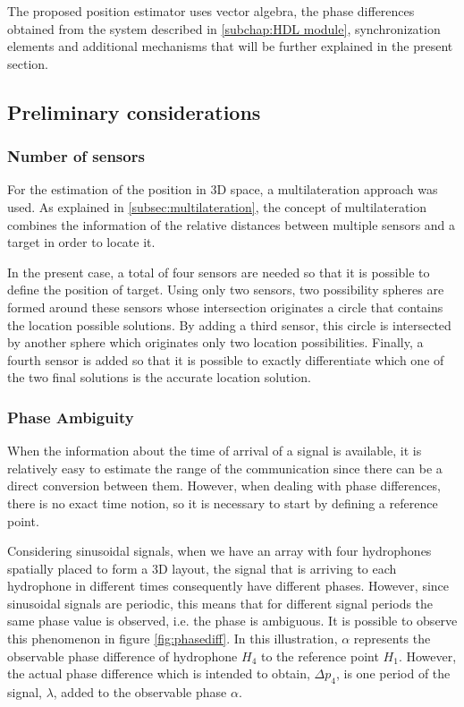 The proposed position estimator uses vector algebra, the phase differences obtained from the system described in \ref{subchap:HDL module}, synchronization elements and additional mechanisms that will be further explained in the present section.

\subsection{Preliminary considerations}

\subsubsection{Number of sensors}
For the estimation of the position in 3D space, a multilateration approach was used. As explained in \ref{subsec:multilateration}, the concept of multilateration combines the information of the relative distances between multiple sensors and a target in order to locate it. 

In the present case, a total of four sensors are needed so that it is possible to define the position of target. Using only two sensors, two possibility spheres are formed around these sensors whose intersection originates a circle that contains the location possible solutions. By adding a third sensor, this circle is intersected by another sphere which originates only two location possibilities. Finally, a fourth sensor is added so that it is possible to exactly differentiate which one of the two final solutions is the accurate location solution. 

\subsubsection{Phase Ambiguity}

When the information about the time of arrival of a signal is available, it is relatively easy to estimate the range of the communication since there can be a direct conversion between them. However, when dealing with phase differences, there is no exact time notion, so it is necessary to start by defining a reference point. 

Considering sinusoidal signals, when we have an array with four hydrophones spatially placed to form a 3D layout, the signal that is arriving to each  hydrophone in different times consequently have different phases. However, since sinusoidal signals are periodic, this means that for different signal periods the same phase value is observed, i.e. the phase is ambiguous. It is possible to observe this phenomenon in figure \ref{fig:phasediff}. In this illustration, $\alpha$ represents the observable phase difference of hydrophone $H_4$ to the reference point $H_1$. However, the actual phase difference which is intended to obtain, $\Delta p_4$, is one period of the signal, $\lambda$, added to the observable phase $\alpha$.

